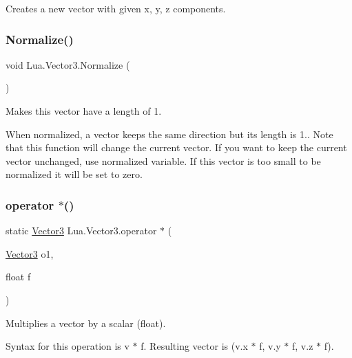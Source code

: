 Creates a new vector with given x, y, z components. 

\mbox{\label{class_lua_1_1_vector3_a5855d8e4953dffcb076b9e5949406203}} 
\subsubsection{\texorpdfstring{Normalize()}{Normalize()}}
{\footnotesize\ttfamily void Lua.\+Vector3.\+Normalize (\begin{DoxyParamCaption}{ }\end{DoxyParamCaption})}



Makes this vector have a length of 1. 

When normalized, a vector keeps the same direction but its length is 1.. Note that this function will change the current vector. If you want to keep the current vector unchanged, use normalized variable. If this vector is too small to be normalized it will be set to zero. \mbox{\label{class_lua_1_1_vector3_aa66ef31f1ffe0fd4f7f5bc2f6f55ee5f}} 
\subsubsection{\texorpdfstring{operator $\ast$()}{operator *()}\hspace{0.1cm}{\footnotesize\ttfamily [1/2]}}
{\footnotesize\ttfamily static \mbox{\hyperlink{class_lua_1_1_vector3}{Vector3}} Lua.\+Vector3.\+operator $\ast$ (\begin{DoxyParamCaption}\item[{\mbox{\hyperlink{class_lua_1_1_vector3}{Vector3}}}]{o1,  }\item[{float}]{f }\end{DoxyParamCaption})\hspace{0.3cm}{\ttfamily [static]}}



Multiplies a vector by a scalar (float). 

Syntax for this operation is {\ttfamily v $\ast$ f}. Resulting vector is {\ttfamily (v.\+x $\ast$ f, v.\+y $\ast$ f, v.\+z $\ast$ f)}. \mbox{\label{class_lua_1_1_vector3_a94992e368b015b3446d372df71c93d30}} 
